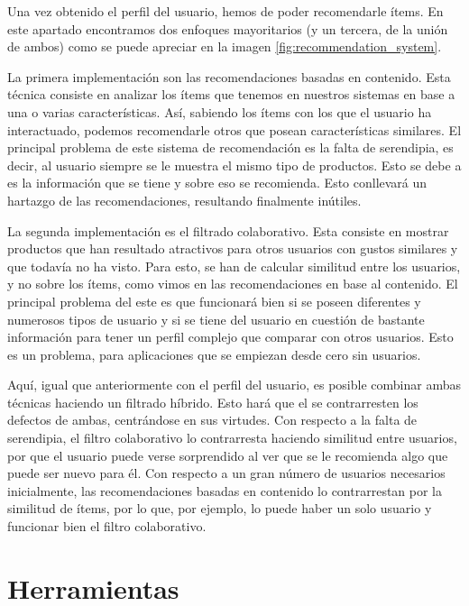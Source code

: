 
Una vez obtenido el perfil del usuario, hemos de poder recomendarle ítems. En este apartado encontramos dos enfoques mayoritarios (y un tercera, de la unión de ambos) como se puede apreciar en la imagen \ref{fig:recommendation_system}.

La primera implementación son las recomendaciones basadas en contenido. Esta técnica consiste en analizar los ítems que tenemos en nuestros sistemas en base a una o varias características. Así, sabiendo los ítems con los que el usuario ha interactuado, podemos recomendarle otros que posean características similares. El principal problema de este sistema de recomendación es la falta de serendipia, es decir, al usuario siempre se le muestra el mismo tipo de productos. Esto se debe a es la información que se tiene y sobre eso se recomienda. Esto conllevará un hartazgo de las recomendaciones, resultando finalmente inútiles.

La segunda implementación es el filtrado colaborativo. Esta consiste en mostrar productos que han resultado atractivos para otros usuarios con gustos similares y que todavía no ha visto. Para esto, se han de calcular similitud entre los usuarios, y no sobre los ítems, como vimos en las recomendaciones en base al contenido. El principal problema del este es que funcionará bien si se poseen diferentes y numerosos tipos de usuario y si se tiene del usuario en cuestión de bastante información para tener un perfil complejo que comparar con otros usuarios. Esto es un problema, para aplicaciones que se empiezan desde cero sin usuarios.

Aquí, igual que anteriormente con el perfil del usuario, es posible combinar ambas técnicas haciendo un filtrado híbrido. Esto hará que el se contrarresten los defectos de ambas, centrándose en sus virtudes. Con respecto a la falta de serendipia, el filtro colaborativo lo contrarresta haciendo similitud entre usuarios, por que el usuario puede verse sorprendido al ver que se le recomienda algo que puede ser nuevo para él. Con respecto a un gran número de usuarios necesarios inicialmente, las recomendaciones basadas en contenido lo contrarrestan por la similitud de ítems, por lo que, por ejemplo, lo puede haber un solo usuario y funcionar bien el filtro colaborativo.

\section{Herramientas}\label{sec:herramientas}

